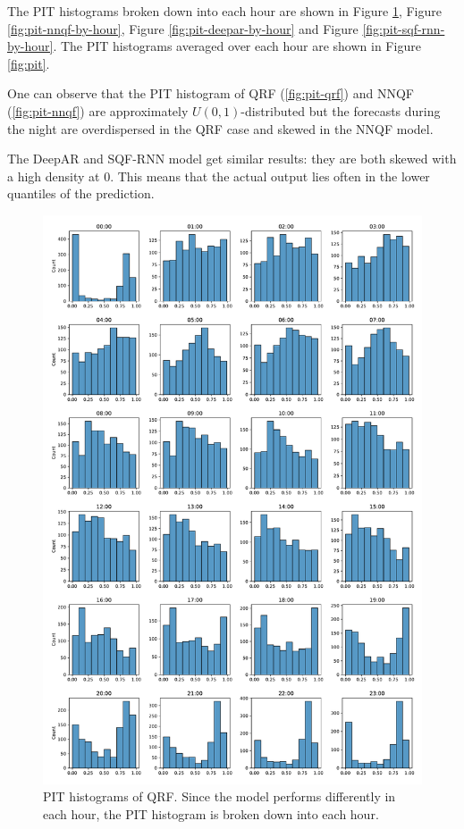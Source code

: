 The PIT histograms broken down into each hour are shown in Figure \ref{fig:pit-qrf-by-hour}, Figure \ref{fig:pit-nnqf-by-hour}, 
Figure \ref{fig:pit-deepar-by-hour} and Figure \ref{fig:pit-sqf-rnn-by-hour}. 
The PIT histograms averaged over each hour are shown in Figure \ref{fig:pit}. 

One can observe that the PIT histogram of QRF (\ref{fig:pit-qrf}) and NNQF (\ref{fig:pit-nnqf}) are approximately 
\(U(0,1)\)-distributed but the forecasts during the night are overdispersed in the QRF case and 
skewed in the NNQF model.

The DeepAR and SQF-RNN model get similar results: they are both skewed with a high density at \(0\). 
This means that the actual output lies often in the lower quantiles of the prediction. 

\begin{figure}[h]%
    \centering
    \includegraphics[width=\textwidth]{plots/pit/pit_by_hour_qrf.pdf}
    \caption[PIT histograms QRF]{PIT histograms of QRF. Since the model performs differently 
    in each hour, the PIT histogram is broken down into each hour.}%
    \label{fig:pit-qrf-by-hour}%
\end{figure}

